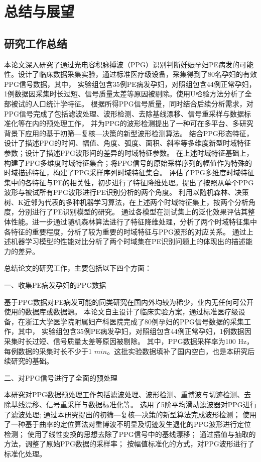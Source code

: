 \chapter{总结与展望}
\section{研究工作总结}
本论文深入研究了通过光电容积脉搏波（PPG）识别判断妊娠孕妇PE病发的可能性。设计了临床数据采集实验，通过标准医疗级设备，采集得到了80名孕妇的有效PPG信号数据，其中，
实验组包含35例PE病发孕妇，对照组包含44例正常孕妇，1例数据因采集时长过短、信号质量太差等原因被剔除。使用U检验方法分析了全部被试的人口统计学特征。
根据所得PPG信号质量，同时结合后续分析需求，对PPG信号完成了包括滤波处理、波形检测、去除基线漂移、信号重采样与数据标准化等在内的预处理工作，
并为PPG的波形检测提出了一种可在多平台、多研究背景下应用的基于初筛—复核—决策的新型波形检测算法。
结合PPG形态特征，设计了描述PPG的时间、幅值、角度、弧度、面积、斜率等多维度新型时域特征参数；设计了描述PPG波形间的差异的时域特征参数。
在上述时域特征基础上，构建了PPG多维度时域特征集合；将PPG信号的原始采样序列的幅值作为特殊的时域描述特征，构建了PPG采样序列时域特征集合。
评估了PPG多维度时域特征集中的各特征与PE的相关性，初步进行了特征降维处理。提出了按照从单个PPG波形与被试所有PPG波形进行PE识别分析的两个角度。
利用以随机森林、决策树、K近邻为代表的多种机器学习算法，在上述两个时域特征集上，按两个分析角度，分别进行了PE识别模型的研究。
通过各模型在测试集上的泛化效果评估其整体性能。进一步通过随机森林算法进行了特征降维处理，分析了两个时域特征集中各特征的重要程度，分析了较为重要的时域特征与PPG波形的对应关系。
通过上述机器学习模型的性能对比分析了两个时域集在PE识别问题上的体现出的描述能力的差异。

总结论文的研究工作，主要包括以下四个方面：

一、收集PE病发孕妇的PPG数据

基于PPG数据对PE病发可能的同类研究在国内外均较为稀少，业内无任何可公开使用的数据库或数据源。
本论文自主设计了临床实验方案，通过标准医疗级设备，在浙江大学医学院附属妇产科医院完成了80例孕妇的PPG信号数据的采集工作，其中，
实验组包含35例PE病发孕妇，对照组包含44例正常孕妇，1例数据因采集时长过短、信号质量太差等原因被剔除。
其中，PPG数据采样率为100 Hz，每例数据的采集时长不少于1 $min$。这批实验数据填补了国内空白，也是本研究后续研究的基础。

二、对PPG信号进行了全面的预处理

本研究对PPG数据预处理工作包括滤波处理、波形检测、重博波与切迹检测、去除基线漂移、信号重采样与数据标准化等。
选用了5阶平均滑动滤波器对PPG进行了滤波处理;
通过本研究提出的初筛—复核—决策的新型算法完成波形检测；
使用了一种基于曲率的定位算法对重博波不明显及切迹发生退化的PPG波形进行定位检测；
使用了线性变换的思想去除了PPG信号中的基线漂移；
通过插值与抽取的方法，调整了原始PPG数据的采样率；
按幅值标准化的方式，对PPG波形进行了标准化处理。

